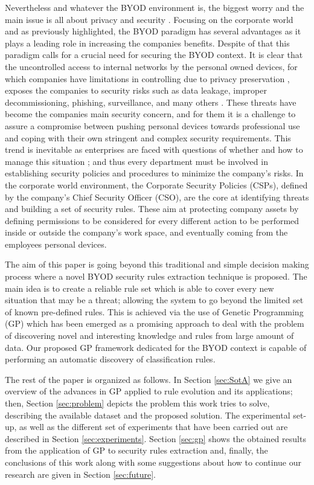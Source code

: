 \documentclass[a4paper,10pt,twocolumn,preprint,3p]{elsarticle}
\begin{document}
Nevertheless and whatever the BYOD environment is, the biggest worry and the main issue is all about privacy and security \cite{miller2012byod}.
Focusing on the corporate world and as previously highlighted, the BYOD paradigm has several advantages
as it plays a leading role in increasing the
companies benefits.  Despite of that this
paradigm calls for a crucial need for securing the BYOD context. It is
clear that the uncontrolled access to internal networks by the
personal owned devices, for which companies have limitations in
controlling due to privacy preservation \cite{miller2012byod}, exposes the companies to security risks such as data
leakage, improper decommissioning, phishing, surveillance, and many
others \cite{lennon2012changing}. These threats have become the
companies main security concern, and for them it is a challenge to
assure a compromise between pushing personal devices towards
professional use and coping with their own stringent and complex
security requirements. This trend is inevitable as enterprises are
faced with questions of whether and how to manage this situation \cite{thomson2012byod}; and
thus every department must be involved in establishing security
policies and procedures to minimize the company's risks. In the
corporate world environment, the Corporate Security Policies (CSPs),
defined by the company's Chief Security Officer (CSO), are the core at
identifying threats and building a set of security rules. These aim at protecting
company assets by defining permissions to be considered for every
different action to be performed inside or outside the company's work
space, and eventually coming from the employees personal devices.

The aim of this paper is going beyond this traditional and simple
decision making process where a novel  BYOD security rules extraction
technique is proposed. The main idea is to create a reliable rule set
which is able to cover every new situation that may be a threat;
allowing the system to go beyond the limited set of known pre-defined
rules. This is achieved via the use of Genetic Programming (GP) which
has been emerged as a promising approach to deal with the problem of
discovering novel and interesting knowledge and rules from large
amount of data. Our proposed GP framework dedicated
for the BYOD context is capable of performing an automatic discovery
of classification rules.

The rest of the paper is organized as follows. In Section \ref{sec:SotA} we give an overview of the advances in GP applied to rule evolution and its applications; then, Section \ref{sec:problem} depicts the problem this work tries to solve, describing the available dataset and the proposed solution. The experimental set-up, as well as the different set of experiments that have been carried out are described in Section \ref{sec:experiments}. Section \ref{sec:gp} shows the obtained results from the application of GP to security rules extraction and, finally, the conclusions of this work along with some suggestions about how to continue our research are given in Section \ref{sec:future}. 
\end{document}

